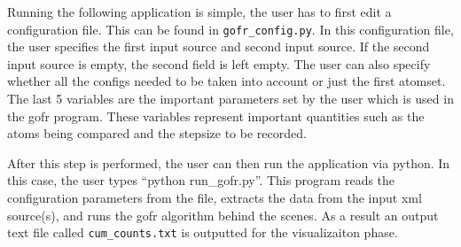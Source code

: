 Running the following application is simple, the user has to first edit a configuration file. This can be found in \verb|gofr_config.py|. In this configuration file, the user specifies the first input source and second input source. If the second input source is empty, the second field is left empty. The user can also specify whether all the configs needed to be taken into account or just the first atomset. The last 5 variables are the important parameters set by the user which is used in the gofr program. These variables represent important quantities such as the atoms being compared and the stepsize to be recorded.




After this step is performed, the user can then run the application via python. In this case, the user types ``python run_gofr.py''. This program reads the configuration parameters from the file, extracts the data from the input xml source(s), and runs the gofr algorithm behind the scenes. As a result an output text file called \verb|cum_counts.txt| is outputted for the visualizaiton phase.